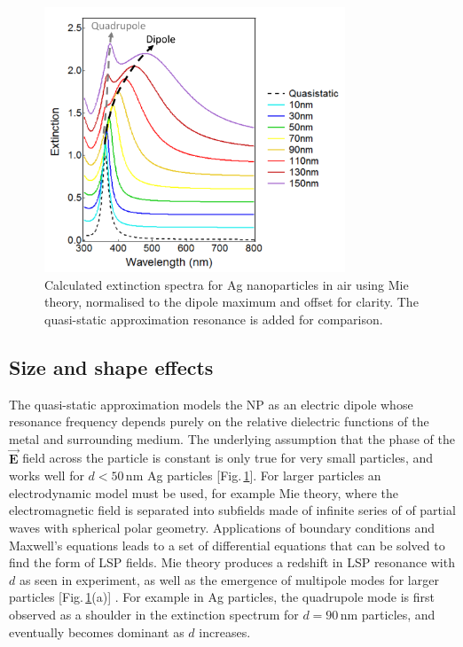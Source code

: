 \begin{figure}[h!] 
\centering    
\includegraphics[width=0.8\textwidth]{Fig9}
\caption{Calculated extinction spectra for Ag nanoparticles in air using Mie theory, normalised to the dipole maximum and offset for clarity. The quasi-static approximation resonance is added for comparison.}
\label{3Fig9}
\end{figure}
\subsection{Size and shape effects}
The quasi-static approximation models the NP as an electric dipole whose resonance frequency depends purely on the relative dielectric functions of the metal and surrounding medium. The underlying assumption that the phase of the $\vec{\mathbf{E}}$ field across the particle is constant is only true for very small particles, and works well for $d<50$\,nm Ag particles [Fig.\,\ref{3Fig9}]. For larger particles an electrodynamic model must be used, for example Mie theory, where the electromagnetic field is separated into subfields made of infinite series of of partial waves with spherical polar geometry. Applications of boundary conditions and Maxwell's equations leads to a set of differential equations that can be solved to find the form of LSP fields. Mie theory produces a redshift in LSP resonance with $d$ as seen in experiment, as well as the emergence of multipole modes for larger particles [Fig.\,\ref{3Fig9}(a)] \cite{Maier2007, Born1999}. For example in Ag particles, the quadrupole mode is first observed as a shoulder in the extinction spectrum for $d=90$\,nm particles, and eventually becomes dominant as $d$ increases.

